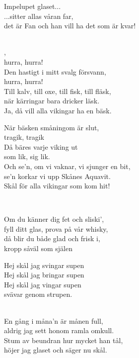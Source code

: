 Impelupet glaset...\\
...sitter allas våran far,\\
det är Fan och han vill ha det som är kvar! \\


 \\       

,\\
hurra, hurra!\\
Den hastigt i mitt svalg försvann,\\
hurra, hurra!\\
Till kalv, till oxe, till fisk, till fläsk,\\
när kärringar bara dricker läsk.\\
Ja, då vill alla vikingar ha en bäsk.

När bäsken småningom är slut,\\
tragik, tragik\\
Då bäres varje viking ut\\
som lik, sig lik.\\
Och se'n, om vi vaknar, vi sjunger en bit,\\
se'n korkar vi upp Skånes Aquavit.\\
Skål för alla vikingar som kom hit!\\

\newpage

 \\       

\songtext{}
Om du känner dig fet och sliski',\\
fyll ditt glas, prova på vår whisky,\\
då blir du både glad och frisk i, \\
kropp såväl som själen

Hej skål jag svingar supen\\
Hej skål jag bringar supen\\
Hej skål jag vingar supen\\
svävar genom strupen.\\

 \\       

\songtext{}
En gång i måna'n är månen full,\\
aldrig jag sett honom ramla omkull.\\
Stum av beundran hur mycket han tål,\\
höjer jag glaset och säger nu skål.


